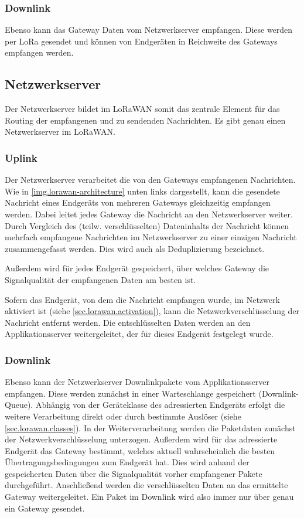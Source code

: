 \subsubsection{Downlink}
Ebenso kann das Gateway Daten vom Netzwerkserver empfangen.
Diese werden per LoRa gesendet und können von Endgeräten in Reichweite des Gateways empfangen werden.


\subsection{Netzwerkserver}
Der Netzwerkserver bildet im LoRaWAN somit das zentrale Element für das Routing der empfangenen und zu sendenden Nachrichten. Es gibt genau einen Netzwerkserver im LoRaWAN.

\subsubsection{Uplink}
Der Netzwerkserver verarbeitet die von den Gateways empfangenen Nachrichten.
Wie in \autoref{img.lorawan-architecture} unten links dargestellt, kann die gesendete Nachricht eines Endgeräts von mehreren Gateways gleichzeitig empfangen werden.
Dabei leitet jedes Gateway die Nachricht an den Netzwerkserver weiter.
Durch Vergleich des (teilw. verschlüsselten) Dateninhalts der  Nachricht können mehrfach empfangene Nachrichten im Netzwerkserver zu einer einzigen Nachricht zusammengefasst werden.
Dies wird auch als Deduplizierung bezeichnet.

Außerdem wird für jedes Endgerät gespeichert, über welches Gateway die Signalqualität der empfangenen Daten am besten ist.

Sofern das Endgerät, von dem die Nachricht empfangen wurde, im Netzwerk aktiviert ist (siehe \autoref{sec.lorawan.activation}), kann die Netzwerkverschlüsselung der Nachricht entfernt werden.
Die entschlüsselten Daten werden an den Applikationsserver weitergeleitet, der für dieses Endgerät festgelegt wurde.

\subsubsection{Downlink}
Ebenso kann der Netzwerkserver Downlinkpakete vom Applikationsserver empfangen.
Diese werden zunächst in einer Warteschlange gespeichert (Downlink-Queue).
Abhängig von der Geräteklasse des adressierten Endgeräts erfolgt die weitere Verarbeitung direkt oder durch bestimmte Auslöser (siehe \autoref{sec.lorawan.classes}).
In der Weiterverarbeitung werden die Paketdaten zunächst der Netzwerkverschlüsselung unterzogen.
Außerdem wird für das adressierte Endgerät das Gateway bestimmt, welches aktuell wahrscheinlich die besten Übertragungsbedingungen zum Endgerät hat.
Dies wird anhand der gespeicherten Daten über die Signalqualität vorher empfangener Pakete durchgeführt.
Anschließend werden die verschlüsselten Daten an das ermittelte Gateway weitergeleitet.
Ein Paket im Downlink wird also immer nur über genau ein Gateway gesendet.


